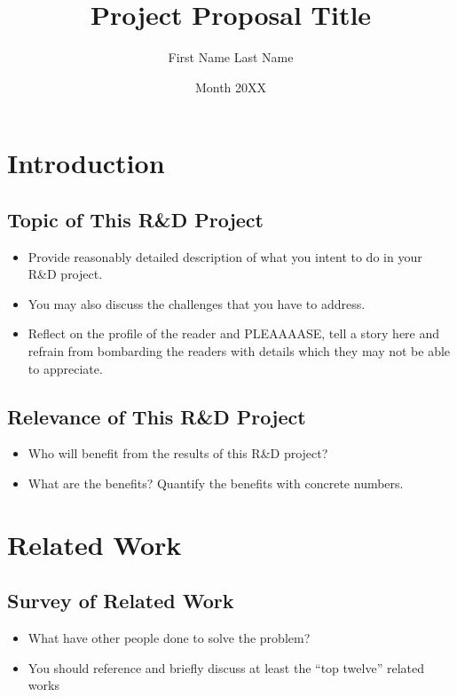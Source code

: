 \documentclass[rnd]{mas_proposal}
\title{Project Proposal Title}
\author{First Name Last Name}
\date{Month 20XX}
\begin{document}
\maketitle

\pagestyle{plain}

\section{Introduction}

\subsection{Topic of This R\&D Project}
\begin{itemize}
    \item Provide reasonably detailed description of what you intent to do in your R\&D project.
    \item You may also discuss the challenges that you have to address.
    \item Reflect on the profile of the reader and PLEAAAASE, tell a story here and refrain from bombarding the readers with details which they may not be able to appreciate.
\end{itemize}

\subsection{Relevance of This R\&D Project}
\begin{itemize}
    \item Who will benefit from the results of this R\&D project?
    \item What are the benefits? Quantify the benefits with concrete numbers.
 \end{itemize}

\section{Related Work}

\subsection{Survey of Related Work}
\begin{itemize}
    \item What have other people done to solve the problem?
    \item You should reference and briefly discuss at least the ``top twelve'' related works
\end{itemize}
\end{document}
